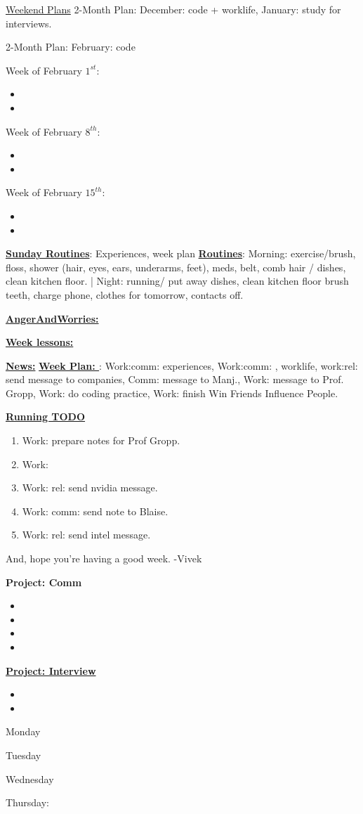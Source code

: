\underline{Weekend Plans} 
2-Month Plan: December: code + worklife, January: study for
interviews. 

2-Month Plan: February:  code  

Week of February $1^{st}$: 
\begin{itemize} 
\tiny \item \tiny 
\item \tiny 
\end{itemize} 

Week of February $8^{th}$: 
\begin{itemize} 
\tiny \item \tiny  
\item \tiny 
\end{itemize} 

Week of February $15^{th}$:
\begin{itemize} 
\tiny \item \tiny 
\item \tiny 
\end{itemize} 


\underline{\textbf{Sunday Routines}}: Experiences, week plan 
\underline{\bf Routines}: Morning: exercise/brush, floss, shower
(hair, eyes, ears, underarms, feet), meds, belt, comb hair / dishes,
clean kitchen floor. |  Night: running/ put away dishes, clean
kitchen floor brush teeth, charge phone, clothes for tomorrow,
contacts off. 

\underline{\textbf{AngerAndWorries:}} 

\underline{\textbf{Week lessons:}} 

\underline{\bf{News:}} 
\underline{\bf{Week Plan: }}: Work:comm: experiences, Work:comm: , 
worklife, work:rel: send message to companies, Comm: message to
Manj., Work: message to Prof. Gropp, Work: do coding practice,  Work:
finish Win Friends Influence People. 

\underline{\textbf{Running TODO}} 
\begin{enumerate} 
\tiny \item \tiny Work: prepare notes for Prof Gropp. \pr{} 
\item \tiny Work: 
\tiny \item \tiny Work: rel: send nvidia message. \te{}  
\tiny \item \tiny Work: comm: send note to Blaise.  
\tiny \item \tiny Work: rel: send intel message. 
\end{enumerate} 




And, hope you're having a good week. -Vivek 

\textbf{Project: Comm} 
\begin{itemize} 
\item \tiny 
\item \tiny 
\item \tiny 
\item \tiny 
\end{itemize}  

\underline{\textbf{Project: Interview}}
\begin{itemize} 
\item \tiny 
\item \tiny
\end{itemize} 


Monday 

Tuesday 

Wednesday 

Thursday:  
